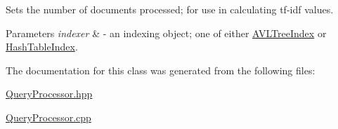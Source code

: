 Sets the number of documents processed; for use in calculating tf-\/idf values. 


\begin{DoxyParams}{Parameters}
{\em indexer} & -\/ an indexing object; one of either \hyperlink{class_a_v_l_tree_index}{A\+V\+L\+Tree\+Index} or \hyperlink{class_hash_table_index}{Hash\+Table\+Index}. \\
\hline
\end{DoxyParams}


The documentation for this class was generated from the following files\+:\begin{DoxyCompactItemize}
\item 
\hyperlink{_query_processor_8hpp}{Query\+Processor.\+hpp}\item 
\hyperlink{_query_processor_8cpp}{Query\+Processor.\+cpp}\end{DoxyCompactItemize}
